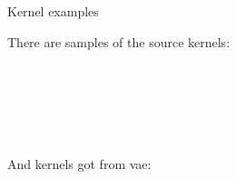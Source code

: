 \documentclass[19pt]{beamer}
\begin{document}
\begin{frame}{Kernel examples}

There are samples of the source kernels:\\

\begin{figure}
    \centering
    \begin{subfigure}%
        \texttt{[image: sourcekernel1.jpg]}
    \end{subfigure}
    ~ %
    \begin{subfigure}%
        \texttt{[image: sourcekernel2.jpg]}
        \label{fig:tiger}
    \end{subfigure}
    ~ %
    \begin{subfigure}%
        \texttt{[image: sourcekernel3.jpg]}
        \label{fig:mouse}
    \end{subfigure}
     ~ %
    \begin{subfigure}%
        \texttt{[image: sourcekernel4.jpg]}
        \label{fig:mouse}
    \end{subfigure}
    \label{fig:animals}
\end{figure}

And kernels got from vae:\\


\end{frame}
\end{document}
